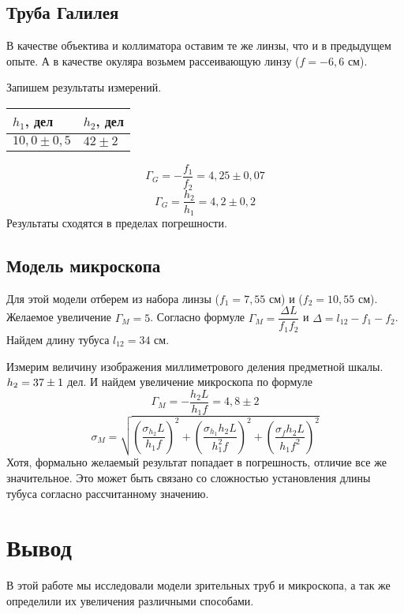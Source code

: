 	\subsection{Труба Галилея}
	В качестве объектива и коллиматора оставим те же линзы, что и в предыдущем опыте. А в качестве окуляра возьмем рассеивающую линзу ($f = -6,6$ см).
	
	Запишем результаты измерений.
	\begin{table}[H]
		\centering
		\begin{tabular}{|l|l|}
			\hline
			$h_1$, дел   & $h_2$, дел \\ \hline
			$10,0\pm0,5$ & $42\pm2$   \\ \hline
		\end{tabular}
	\end{table}

	\[
		\Gamma_G = -\frac{f_1}{f_2} = 4,25\pm0,07
	\]
	\[
		\Gamma_G = \frac{h_2}{h_1} = 4,2\pm 0,2
	\]
	Результаты сходятся в пределах погрешности.
	
	\subsection{Модель микроскопа}
	Для этой модели отберем из набора линзы ($f_1 = 7,55$ см) и ($f_2 = 10,55$ см). Желаемое увеличение $\Gamma_M = 5$. Согласно формуле $\Gamma_M = \dfrac{\Delta L}{f_1f_2}$ и $\Delta = l_{12} - f_1 - f_2$. Найдем длину тубуса $l_{12} = 34$ см.
	
	Измерим величину изображения миллиметрового деления предметной шкалы. $h_2 \hm= 37\pm1$ дел. И найдем увеличение микроскопа по формуле
	\[
		\Gamma_M = -\frac{h_2L}{h_1f} = 4,8\pm2
	\]
	\[
		\sigma_M = \sqrt{\left(\frac{\sigma_{h_2}L}{h_1f}\right)^2 + \left(\frac{\sigma_{h_1}h_2L}{h_1^2f}\right)^2+ \left(\frac{\sigma_{f}h_2L}{h_1f^2}\right)^2}
	\]
	Хотя, формально желаемый результат попадает в погрешность, отличие все же значительное. Это может быть связано со сложностью установления длины тубуса согласно рассчитанному значению.
	\section{Вывод}
	В этой работе мы исследовали модели зрительных труб и микроскопа, а так же определили их увеличения различными способами.
	
	
	
	
	
	
	
	
	
	
	
	
	
	
	
	
	
	
	

